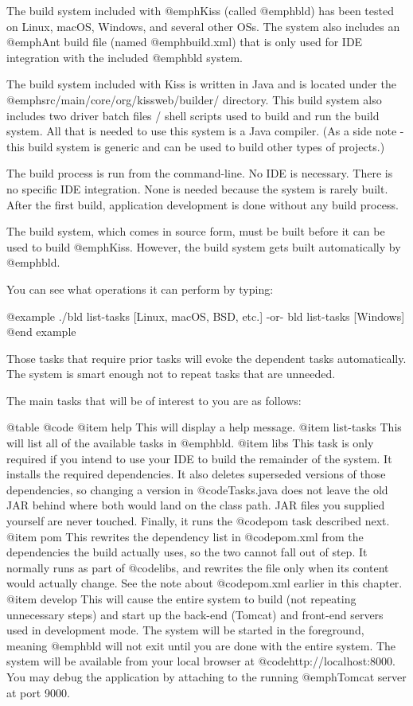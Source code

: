 The build system included with @emph{Kiss} (called @emph{bld}) has
been tested on Linux, macOS, Windows, and several other OSs.  The
system also includes an @emph{Ant} build file (named @emph{build.xml})
that is only used for IDE integration with the included @emph{bld}
system.

The build system included with Kiss is written in Java and is located
under the @emph{src/main/core/org/kissweb/builder/} directory.  This
build system also includes two driver batch files / shell scripts used
to build and run the build system.  All that is needed to use this
system is a Java compiler.  (As a side note - this build system is
generic and can be used to build other types of projects.)

The build process is run from the command-line.  No IDE is necessary.
There is no specific IDE integration.  None is needed because the system
is rarely built.  After the first build, application development is done
without any build process.

The build system, which comes in source form, must be built before it
can be used to build @emph{Kiss}.  However, the build system gets built
automatically by @emph{bld}.

You can see what operations it can perform by typing:

@example
    ./bld list-tasks           [Linux, macOS, BSD, etc.]
        -or-
    bld list-tasks             [Windows]
@end example

Those tasks that require prior tasks will evoke the dependent tasks
automatically.  The system is smart enough not to repeat tasks that
are unneeded.

The main tasks that will be of interest to you are as follows:

@table @code
@item help
This will display a help message.
@item list-tasks
This will list all of the available tasks in @emph{bld}.
@item libs
This task is only required if you intend to use your IDE to build the
remainder of the system.  It installs the required dependencies.  It also
deletes superseded versions of those dependencies, so changing a version in
@code{Tasks.java} does not leave the old JAR behind where both would land on
the class path.  JAR files you supplied yourself are never touched.  Finally,
it runs the @code{pom} task described next.
@item pom
This rewrites the dependency list in @code{pom.xml} from the dependencies the
build actually uses, so the two cannot fall out of step.  It normally runs as
part of @code{libs}, and rewrites the file only when its content would
actually change.  See the note about @code{pom.xml} earlier in this chapter.
@item develop
This will cause the entire system to build (not repeating unnecessary
steps) and start up the back-end (Tomcat) and front-end servers used
in development mode.  The system will be started in the foreground,
meaning @emph{bld} will not exit until you are done with the entire
system.  The system will be available from your local browser at
@code{http://localhost:8000}.  You may debug the application by
attaching to the running @emph{Tomcat} server at port 9000.

